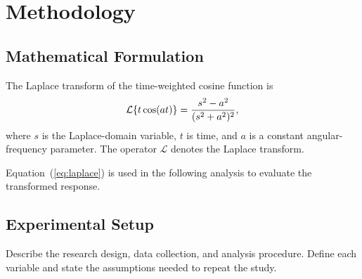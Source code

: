 \chapter{Methodology}

\section{Mathematical Formulation}

The Laplace transform of the time-weighted cosine function is
\begin{equation}
  \mathcal{L}\{t\cos(at)\} = \frac{s^2 - a^2}{(s^2 + a^2)^2},
  \eqtitle{Laplace Transform Identity}
  \label{eq:laplace}
\end{equation}
where $s$ is the Laplace-domain variable, $t$ is time, and $a$ is a constant
angular-frequency parameter. The operator $\mathcal{L}$ denotes the Laplace
transform.

Equation~(\ref{eq:laplace}) is used in the following analysis to evaluate the
transformed response.

\section{Experimental Setup}

Describe the research design, data collection, and analysis procedure. Define
each variable and state the assumptions needed to repeat the study.

